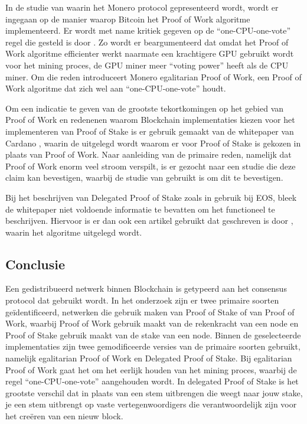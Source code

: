 In de studie van \cite{van2013cryptonote} waarin het Monero protocol gepresenteerd wordt, wordt er ingegaan op de manier waarop Bitcoin het Proof of Work algoritme implementeerd. Er wordt met name kritiek gegeven op de ``one-CPU-one-vote'' regel die gesteld is door \citeauthor{nakamoto2008bitcoin}. Zo wordt er beargumenteerd dat omdat het Proof of Work algoritme efficienter werkt naarmate een krachtigere GPU gebruikt wordt voor het mining proces, de GPU miner meer ``voting power'' heeft als de CPU miner. Om die reden introduceert Monero egalitarian Proof of Work, een Proof of Work algoritme dat zich wel aan ``one-CPU-one-vote'' houdt.

Om een indicatie te geven van de grootste tekortkomingen op het gebied van Proof of Work en redenenen waarom Blockchain implementaties kiezen voor het implementeren van Proof of Stake is er gebruik gemaakt van de whitepaper van Cardano \cite{kiayias2017ouroboros}, waarin de uitgelegd wordt waarom er voor Proof of Stake is gekozen in plaats van Proof of Work. Naar aanleiding van de primaire reden, namelijk dat Proof of Work enorm veel stroom verspilt, is er gezocht naar een studie die deze claim kan bevestigen, waarbij de studie van \cite{ODwyer:Bitcoin} gebruikt is om dit te bevestigen.

Bij het beschrijven van Delegated Proof of Stake zoals in gebruik bij EOS, bleek de whitepaper niet voldoende informatie te bevatten om het functioneel te beschrijven. Hiervoor is er dan ook een artikel gebruikt dat geschreven is door \cite{steemit:eos_dpos}, waarin het algoritme uitgelegd wordt.

\subsection{Conclusie}

Een gedistribueerd netwerk binnen Blockchain is getypeerd aan het consensus protocol dat gebruikt wordt. In het onderzoek zijn er twee primaire soorten geïdentificeerd, netwerken die gebruik maken van Proof of Stake of van Proof of Work, waarbij Proof of Work gebruik maakt van de rekenkracht van een \gls{node} en Proof of Stake gebruik maakt van de \gls{stake} van een \gls{node}. Binnen de geselecteerde implementaties zijn twee gemodificeerde versies van de primaire soorten gebruikt, namelijk egalitarian Proof of Work en Delegated Proof of Stake. Bij egalitarian Proof of Work gaat het om het eerlijk houden van het mining proces, waarbij de regel ``one-CPU-one-vote'' aangehouden wordt. In delegated Proof of Stake is het grootste verschil dat in plaats van een stem uitbrengen die weegt naar jouw \gls{stake}, je een stem uitbrengt op vaste vertegenwoordigers die verantwoordelijk zijn voor het creëren van een nieuw block.
